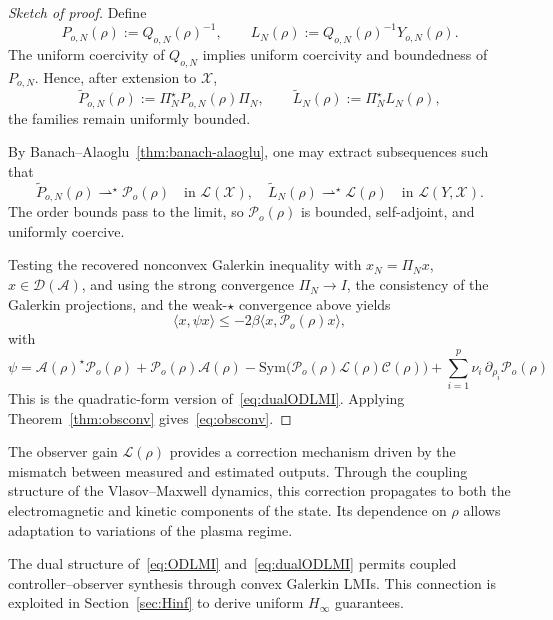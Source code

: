 \documentclass[AMA,Times2COL]{WileyNJDv5}
\begin{document}
\begin{proof}[Sketch of proof]
Define
\[
P_{o,N}(\rho):=Q_{o,N}(\rho)^{-1},
\qquad
L_N(\rho):=Q_{o,N}(\rho)^{-1}Y_{o,N}(\rho).
\]
The uniform coercivity of $Q_{o,N}$ implies uniform coercivity and boundedness of $P_{o,N}$. Hence, after extension to $\mathscr X$,
\[
\widetilde P_{o,N}(\rho):=\Pi_N^\star P_{o,N}(\rho)\Pi_N,
\qquad
\widetilde L_N(\rho):=\Pi_N^\star L_N(\rho),
\]
the families remain uniformly bounded.

By Banach--Alaoglu~\ref{thm:banach-alaoglu}, one may extract subsequences such that
\[
\widetilde P_{o,N}(\rho)\rightharpoonup^\star \mathcal P_o(\rho)
\quad\text{in }\mathcal L(\mathscr X),
\quad
\widetilde L_N(\rho)\rightharpoonup^\star \mathcal L(\rho)
\quad\text{in }\mathcal L(Y,\mathscr X).
\]
The order bounds pass to the limit, so $\mathcal P_o(\rho)$ is bounded, self-adjoint, and uniformly coercive.

Testing the recovered nonconvex Galerkin inequality with
$x_N=\Pi_Nx$, $x\in\mathcal D(\mathcal A)$, and using the strong convergence $\Pi_N\to I$, the consistency of the Galerkin projections, and the weak-$\star$ convergence above yields
\[
\Big\langle x,\psi x
\Big\rangle
\le
-2\beta\langle x,\mathcal P_o(\rho)x\rangle ,
\]
with \[\psi= \mathcal A(\rho)^\star\mathcal P_o(\rho)
+
\mathcal P_o(\rho)\mathcal A(\rho)
-
\mathrm{Sym}\big(
\mathcal P_o(\rho)\mathcal L(\rho)\mathcal C(\rho)
\big)
+
\sum_{i=1}^p \nu_i\,\partial_{\rho_i}\mathcal P_o(\rho)
\]
This is the quadratic-form version of~\eqref{eq:dualODLMI}. Applying Theorem~\ref{thm:obsconv} gives~\eqref{eq:obsconv}.
\end{proof}

\begin{remark}
The observer gain $\mathcal L(\rho)$ provides a correction mechanism driven by the mismatch between measured and estimated outputs. Through the coupling structure of the Vlasov--Maxwell dynamics, this correction propagates to both the electromagnetic and kinetic components of the state. Its dependence on $\rho$ allows adaptation to variations of the plasma regime.
\end{remark}

\begin{remark}
The dual structure of~\eqref{eq:ODLMI} and~\eqref{eq:dualODLMI}
permits coupled controller--observer synthesis through convex Galerkin LMIs.
This connection is exploited in Section~\ref{sec:Hinf} to derive uniform $H_\infty$ guarantees.
\end{remark}
\end{document}
